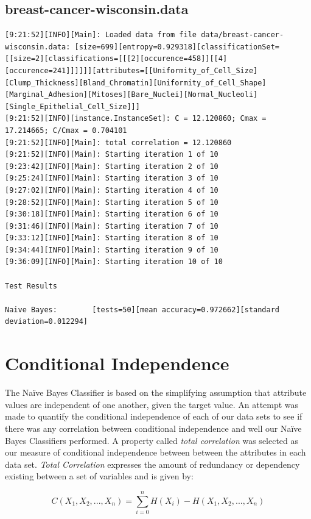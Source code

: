 \documentclass[10pt]{report}
\begin{document}
\subsection*{breast-cancer-wisconsin.data}
{\small
\begin{verbatim}
[9:21:52][INFO][Main]: Loaded data from file data/breast-cancer-wisconsin.data: [size=699][entropy=0.929318][classificationSet=[[size=2][classifications=[[[2][occurence=458]][[4][occurence=241]]]]]][attributes=[[Uniformity_of_Cell_Size][Clump_Thickness][Bland_Chromatin][Uniformity_of_Cell_Shape][Marginal_Adhesion][Mitoses][Bare_Nuclei][Normal_Nucleoli][Single_Epithelial_Cell_Size]]] 
[9:21:52][INFO][instance.InstanceSet]: C = 12.120860; Cmax = 17.214665; C/Cmax = 0.704101 
[9:21:52][INFO][Main]: total correlation = 12.120860 
[9:21:52][INFO][Main]: Starting iteration 1 of 10 
[9:23:42][INFO][Main]: Starting iteration 2 of 10 
[9:25:24][INFO][Main]: Starting iteration 3 of 10 
[9:27:02][INFO][Main]: Starting iteration 4 of 10 
[9:28:52][INFO][Main]: Starting iteration 5 of 10 
[9:30:18][INFO][Main]: Starting iteration 6 of 10 
[9:31:46][INFO][Main]: Starting iteration 7 of 10 
[9:33:12][INFO][Main]: Starting iteration 8 of 10 
[9:34:44][INFO][Main]: Starting iteration 9 of 10 
[9:36:09][INFO][Main]: Starting iteration 10 of 10 

Test Results

Naive Bayes:		[tests=50][mean accuracy=0.972662][standard deviation=0.012294] 
\end{verbatim}
}


\section{Conditional Independence}
The Na\"{i}ve Bayes Classifier is based on the simplifying assumption
that attribute values are independent of one another, given the target
value. An attempt was made to quantify the conditional independence of
each of our data sets to see if there was any correlation between
conditional independence and well our Na\"{i}ve Bayes Classifiers
performed. A property called \textit{total correlation}
\cite{RefWorks:44} was selected as our measure of conditional
independence between between the attributes in each data
set. \textit{Total Correlation} expresses the amount of redundancy or
dependency existing between a set of variables and is given by:

\begin{equation*}
C(X_1,X_2,...,X_n) = \sum_{i=0}^n H(X_i) - H(X_1,X_2,...,X_n)
\end{equation*}
\end{document}
